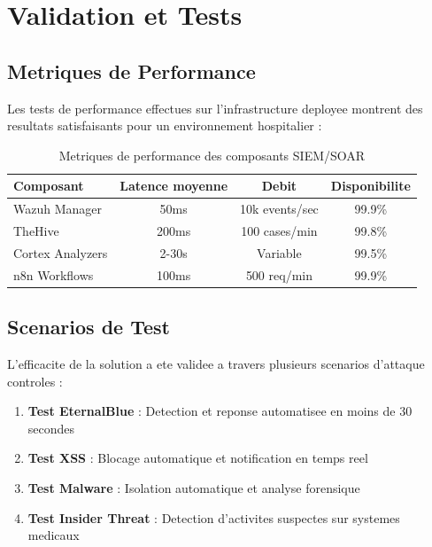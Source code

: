 \section{Validation et Tests}

\subsection{Metriques de Performance}

Les tests de performance effectues sur l'infrastructure deployee montrent des resultats satisfaisants pour un environnement hospitalier :

\begin{table}[H]
    \centering
    \caption{Metriques de performance des composants SIEM/SOAR}
    \begin{tabular}{|l|c|c|c|}
        \hline
        \textbf{Composant} & \textbf{Latence moyenne} & \textbf{Debit} & \textbf{Disponibilite} \\
        \hline
        Wazuh Manager      & 50ms                     & 10k events/sec & 99.9\%                 \\
        \hline
        TheHive            & 200ms                    & 100 cases/min  & 99.8\%                 \\
        \hline
        Cortex Analyzers   & 2-30s                    & Variable       & 99.5\%                 \\
        \hline
        n8n Workflows      & 100ms                    & 500 req/min    & 99.9\%                 \\
        \hline
    \end{tabular}
\end{table}

\subsection{Scenarios de Test}

L'efficacite de la solution a ete validee a travers plusieurs scenarios d'attaque controles :

\begin{enumerate}
    \item \textbf{Test EternalBlue} : Detection et reponse automatisee en moins de 30 secondes
    \item \textbf{Test XSS} : Blocage automatique et notification en temps reel
    \item \textbf{Test Malware} : Isolation automatique et analyse forensique
    \item \textbf{Test Insider Threat} : Detection d'activites suspectes sur systemes medicaux
\end{enumerate}

